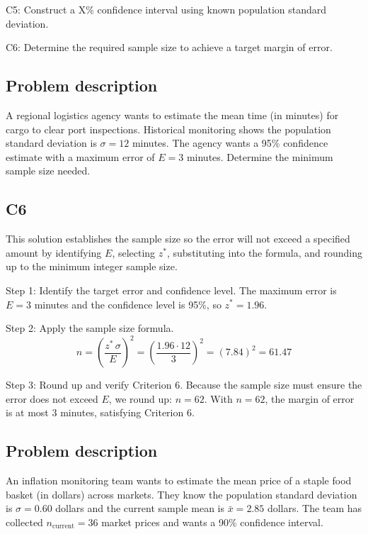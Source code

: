 

	
	\begin{ExamCriteria}
		\item C5: Construct a X\% confidence interval using known population standard deviation.
		\item C6: Determine the required sample size to achieve a target margin of error.
	\end{ExamCriteria}
	
	\begin{ExamProblems}
		\item
		\subsection*{Problem description}
		A regional logistics agency wants to estimate the mean time (in minutes) for cargo to clear port inspections. Historical monitoring shows the population standard deviation is $\sigma = 12$ minutes. The agency wants a 95\% confidence estimate with a maximum error of $E = 3$ minutes. Determine the minimum sample size needed.
		
		\subsection*{C6}
		This solution establishes the sample size so the error will not exceed a specified amount by identifying $E$, selecting $z^*$, substituting into the formula, and rounding up to the minimum integer sample size.
		
		Step 1: Identify the target error and confidence level. The maximum error is $E = 3$ minutes and the confidence level is 95\%, so $z^* = 1.96$.
		
		Step 2: Apply the sample size formula.
		\[
		n = \left(\frac{z^*\,\sigma}{E}\right)^2
		= \left(\frac{1.96 \cdot 12}{3}\right)^2
		= \left(7.84\right)^2
		= 61.47
		\]
		
		Step 3: Round up and verify Criterion 6. Because the sample size must ensure the error does not exceed $E$, we round up: $n = 62$. With $n=62$, the margin of error is at most 3 minutes, satisfying Criterion 6.
		
		\item
		\subsection*{Problem description}
		An inflation monitoring team wants to estimate the mean price of a staple food basket (in dollars) across markets. They know the population standard deviation is $\sigma = 0.60$ dollars and the current sample mean is $\bar{x} = 2.85$ dollars. The team has collected $n_{\text{current}} = 36$ market prices and wants a 90\% confidence interval.
		

\end{ExamProblems}
